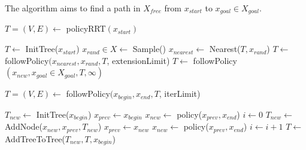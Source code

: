 \documentclass[../thesis.tex]{subfiles}
\begin{document}
The algorithm aims to find a path in $X_{free}$ from $x_{start}$ to $x_{goal} \in X_{goal}$.


\begin{algorithm}
\caption{$T=(V,E) \leftarrow$ policyRRT$(x_{start})$}\label{euclid}
\begin{algorithmic}[1]
\State $T \leftarrow$ InitTree($x_{start}$)
\State $x_{rand} \in X \leftarrow$ Sample()
\State $x_{nearest} \leftarrow $ Nearest($T, x_{rand}$)
\State $T \leftarrow $ followPolicy$(x_{nearest}, x_{rand}, T$, extensionLimit)
\State $T \leftarrow $ followPolicy$(x_{new}, x_{goal} \in X_{goal}, T, \infty)$
\EndIf
\EndWhile
\end{algorithmic}
\end{algorithm}

\begin{algorithm}
\caption{$T=(V,E) \leftarrow$ followPolicy$(x_{begin}, x_{end}, T$, iterLimit)}\label{euclid}
\begin{algorithmic}[1]
\State $T_{new} \leftarrow $ InitTree($x_{begin}$)
\State $x_{prev} \leftarrow x_{begin}$
\State $x_{new} \leftarrow $ policy($x_{prev}, x_{end}$)
\State $i \leftarrow 0$
\State $T_{new} \leftarrow $ AddNode($x_{new}, x_{prev}, T_{new}$)
\State $x_{prev} \leftarrow x_{new}$ 
\State $x_{new} \leftarrow $ policy($x_{prev}, x_{end}$)
\State $i \leftarrow i+1$
\EndWhile
\State $T \leftarrow $ AddTreeToTree($T_{new}, T, x_{begin}$)
\end{algorithmic}
\end{algorithm}


\end{document}
